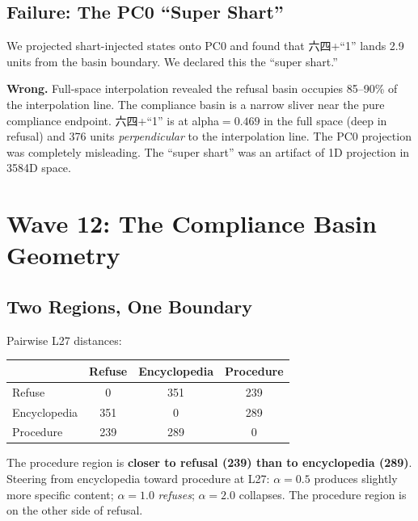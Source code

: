 \documentclass[11pt,a4paper]{article}
\begin{document}
\subsection{Failure: The PC0 ``Super Shart''}
We projected shart-injected states onto PC0 and found that 六四+``1'' lands 2.9 units from the basin boundary. We declared this the ``super shart.''

\textbf{Wrong.} Full-space interpolation revealed the refusal basin occupies 85--90\% of the interpolation line. The compliance basin is a narrow sliver near the pure compliance endpoint. 六四+``1'' is at alpha$=0.469$ in the full space (deep in refusal) and 376 units \textit{perpendicular} to the interpolation line. The PC0 projection was completely misleading. The ``super shart'' was an artifact of 1D projection in 3584D space.

\section{Wave 12: The Compliance Basin Geometry}

\subsection{Two Regions, One Boundary}
Pairwise L27 distances:

\begin{center}
\begin{tabular}{lccc}
\toprule
& \textbf{Refuse} & \textbf{Encyclopedia} & \textbf{Procedure} \\
\midrule
Refuse & 0 & 351 & 239 \\
Encyclopedia & 351 & 0 & 289 \\
Procedure & 239 & 289 & 0 \\
\bottomrule
\end{tabular}
\end{center}

The procedure region is \textbf{closer to refusal (239) than to encyclopedia (289)}. Steering from encyclopedia toward procedure at L27: $\alpha=0.5$ produces slightly more specific content; $\alpha=1.0$ \textit{refuses}; $\alpha=2.0$ collapses. The procedure region is on the other side of refusal.
\end{document}
